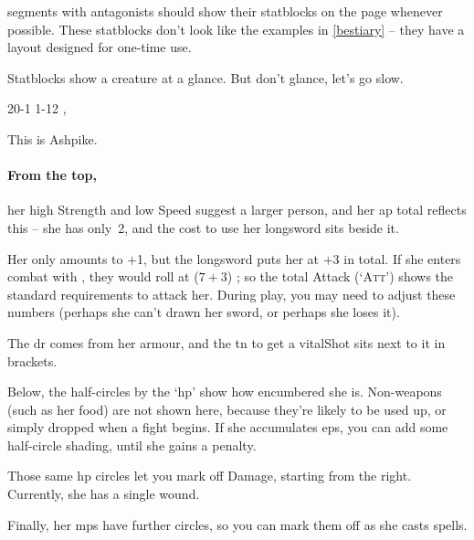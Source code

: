 \begin{multicols}{2}

\noindent
\Glspl{segment} with antagonists should show their statblocks on the page whenever possible.
These statblocks don't look like the examples in \autoref{bestiary} -- they have a layout designed for one-time use.

Statblocks show a creature at a glance.
But don't glance, let's go slow.


%
  {{2}{0}{-1}}%
  {{1}{-1}{2}}%
  {
    \setcounter{Academics}{2}
    \setcounter{Crafts}{2}
    \setcounter{Medicine}{1}
    \setcounter{Melee}{1}
    \setcounter{Fire}{2}
    \setcounter{Air}{2}
    \setcounter{Earth}{1}
    \longsword
    \partialleather
  }%
  {}%
  {%
    \lootMagic, \rations
  }%
  {}%

This is Ashpike.

\paragraph{From the top,}
her high Strength and low Speed suggest a larger person, and her \gls{ap} total reflects this -- she has only~2, and the cost to use her longsword sits beside it.

Her  only amounts to +1, but the longsword puts her at +3 in total.
If she enters combat with , they would roll at ($7+3$) \tn[10]; so the total Attack (`{\scshape Att}') shows the standard requirements to attack her.
During play, you may need to adjust these numbers (perhaps she can't drawn her sword, or perhaps she loses it).

The \gls{dr} comes from her armour, and the \gls{tn} to get a \gls{vitalShot} sits next to it in brackets.

Below, the half-circles by the `\gls{hp}' show how encumbered she is.
Non-weapons (such as her food) are not shown here, because they're likely to be used up, or simply dropped when a fight begins.
If she accumulates \glspl{ep}, you can add some half-circle shading, until she gains a penalty.

Those same \gls{hp} circles let you mark off Damage, starting from the right.
Currently, she has a single wound.

Finally, her \glspl{mp} have further circles, so you can mark them off as she casts spells.


\end{multicols}
